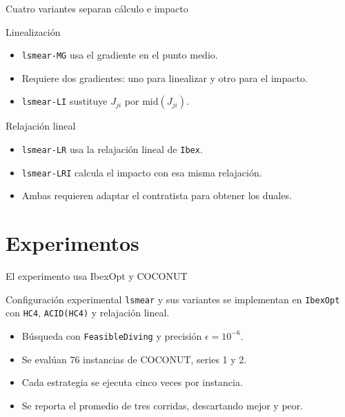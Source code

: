 \documentclass[10pt,aspectratio=169]{beamer}
\begin{document}
\begin{frame}{Cuatro variantes separan cálculo e impacto}
\small
\begin{block}{Linealización}
\begin{itemize}
  \item \texttt{lsmear-MG} usa el gradiente en el punto medio.
  \item Requiere dos gradientes: uno para linealizar y otro para el impacto.
  \item \texttt{lsmear-LI} sustituye \(J_{ji}\) por \(\mathrm{mid}(J_{ji})\).
\end{itemize}
\end{block}

\begin{alertblock}{Relajación lineal}
\begin{itemize}
  \item \texttt{lsmear-LR} usa la relajación lineal de \texttt{Ibex}.
  \item \texttt{lsmear-LRI} calcula el impacto con esa misma relajación.
  \item Ambas requieren adaptar el contratista para obtener los duales.
\end{itemize}
\end{alertblock}
\end{frame}

\section{Experimentos}

\begin{frame}{El experimento usa IbexOpt y COCONUT}
\small
\begin{block}{Configuración experimental}
\texttt{lsmear} y sus variantes se implementan en \texttt{IbexOpt} con \texttt{HC4}, \texttt{ACID(HC4)} y relajación lineal.
\end{block}

\begin{itemize}
  \item Búsqueda con \texttt{FeasibleDiving} y precisión \(\epsilon=10^{-6}\).
  \item Se evalúan 76 instancias de COCONUT, series 1 y 2.
  \item Cada estrategia se ejecuta cinco veces por instancia.
  \item Se reporta el promedio de tres corridas, descartando mejor y peor.
\end{itemize}
\end{frame}
\end{document}
